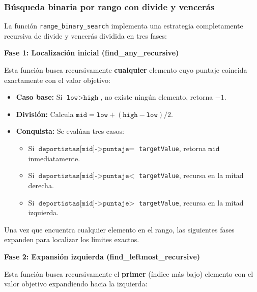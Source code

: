 \subsubsection{Búsqueda binaria por rango con divide y vencerás}

La función \texttt{range\_binary\_search} implementa una estrategia completamente recursiva de divide y vencerás dividida en tres fases:

\textbf{Fase 1: Localización inicial (find\_any\_recursive)}

Esta función busca recursivamente \textbf{cualquier} elemento cuyo puntaje coincida exactamente con el valor objetivo:

\begin{itemize}
    \item \textbf{Caso base:} Si \(\texttt{low} > \texttt{high}\), no existe ningún elemento, retorna $-1$.
    
    \item \textbf{División:} Calcula \(\texttt{mid} = \texttt{low} + (\texttt{high} - \texttt{low}) / 2\).
    
    \item \textbf{Conquista:} Se evalúan tres casos:
    \begin{itemize}
        \item Si \(\texttt{deportistas[mid]->puntaje} =\) \texttt{targetValue}, retorna \(\texttt{mid}\) inmediatamente.
        \item Si \(\texttt{deportistas[mid]->puntaje} <\) \texttt{targetValue}, recursa en la mitad derecha.
        \item Si \(\texttt{deportistas[mid]->puntaje} >\) \texttt{targetValue}, recursa en la mitad izquierda.
    \end{itemize}
\end{itemize}

Una vez que encuentra cualquier elemento en el rango, las siguientes fases expanden para localizar los límites exactos.

\textbf{Fase 2: Expansión izquierda (find\_leftmost\_recursive)}

Esta función busca recursivamente el \textbf{primer} (índice más bajo) elemento con el valor objetivo expandiendo hacia la izquierda:


